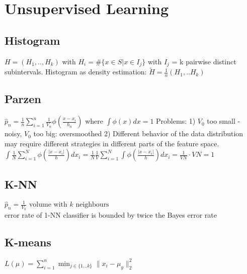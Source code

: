 \section{Unsupervised Learning}
\subsection*{Histogram}
$H = (H_{1},..,H_{k})$ with $H_{i} = \#\{x \in S|x \in I_{j}\}$ with $I_{j}$ = k pairwise distinct subintervals.
Histogram as density estimation: $\widetilde{H} = \frac{1}{n}( H_{1},..H_{k})$
\subsection*{Parzen}
$
\hat{p}_n = \frac{1}{n} \sum\limits_{i=1}^n \frac{1}{V_n} \phi(\frac{x-x_i}{h_n})
$
where $\int \phi(x)dx = 1$
Problems: 1) $V_0$ too small - noisy, $V_0$ too big: oversmoothed 2) Different behavior of the data distribution may
require different strategies in different parts of
the feature space.\\
$\int \frac{1}{N} \sum_{i=1}^N\phi(\frac{|x-x_i|}{h}) dx_i = \frac{1}{N}\frac{1}{V} \sum_{i=1}^N \int \phi(\frac{|x-x_i|}{h}) dx_i = \frac{1}{VN} \cdot VN = 1$

\subsection*{K-NN}
$\hat{p}_n = \frac{1}{V_k} \text{ volume with } k \text{ neighbours}$\\
error rate of 1-NN classifier is bounded by twice the Bayes error rate
\subsection*{K-means}
$L(\mu) = \sum_{i=1}^{n} \min_{j\in\{1...k\}} \|x_i - \mu_y \|_2^2$